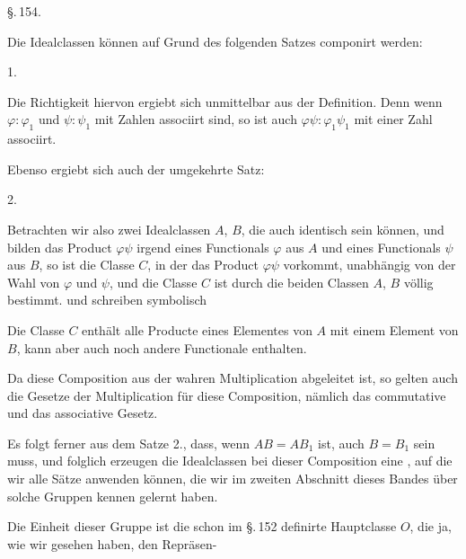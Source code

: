 
\S.\,154.

\begin{center}
\end{center}

Die Idealclassen können auf Grund des folgenden Satzes componirt werden:

1.~

Die Richtigkeit hiervon ergiebt sich unmittelbar aus der Definition. Denn wenn $\varphi:\varphi_1$ und $\psi:\psi_1$ mit Zahlen associirt sind, so ist auch $\varphi\psi:\varphi_1\psi_1$ mit einer Zahl associirt.

Ebenso ergiebt sich auch der umgekehrte Satz:

2.~

Betrachten wir also zwei Idealclassen $A$, $B$, die auch identisch sein können, und bilden das Product $\varphi\psi$ irgend eines Functionals $\varphi$ aus $A$ und eines Functionals $\psi$ aus $B$, so ist die Classe $C$, in der das Product $\varphi\psi$ vorkommt, unabhängig von der Wahl von $\varphi$ und $\psi$, und die Classe $C$ ist durch die beiden Classen $A$, $B$ völlig bestimmt.  und schreiben symbolisch


Die Classe $C$ enthält alle Producte eines Elementes von $A$ mit einem Element von $B$, kann aber auch noch andere Functionale enthalten.

Da diese Composition aus der wahren Multiplication abgeleitet ist, so gelten auch die Gesetze der Multiplication für diese Composition, nämlich das commutative und das associative Gesetz.

Es folgt ferner aus dem Satze 2., dass, wenn $AB = AB_1$ ist, auch $B = B_1$ sein muss, und folglich erzeugen die Idealclassen bei dieser Composition eine , auf die wir alle Sätze anwenden können, die wir im zweiten Abschnitt dieses Bandes über solche Gruppen kennen gelernt haben.

Die Einheit dieser Gruppe ist die schon im \S.\,152 definirte Hauptclasse $O$, die ja, wie wir gesehen haben, den Repräsen-
